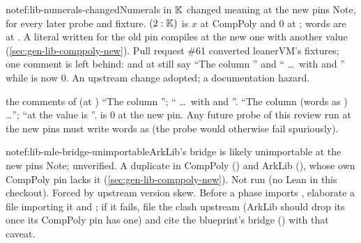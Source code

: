 \begin{finding}{note}{f:lib-numerals-changed}{Numerals in \texorpdfstring{$\mathbb{K}$}{K} changed meaning at the new pins}
\textsf{Note, for every later probe and fixture.}
 $(2 : \mathbb{K})$ is $x$ at CompPoly  and $0$ at ; words are
 at . A literal written for the old pin compiles at the new one with
another value (\cref{sec:gen-lib-comppoly-new}). Pull request \#61 converted leanerVM's fixtures;
one comment is left behind: \allowbreak{}\allowbreak{}\allowbreak{} and 
at  still say \enquote{The column \lean{[1, 2, 3, 4]}} and \enquote{
\dots\ with  and } while  is now $0$.
 An upstream change adopted; a documentation hazard.
\begin{change}{the comments of \allowbreak{}\allowbreak{}\allowbreak{} (at )}
\asis \enquote{The column \lean{[1, 2, 3, 4]}}; \enquote{ \dots\ with
 and }.
\asproposed \enquote{The column \lean{[1, x, x + 1, x²]} (words  as
) \dots}; \enquote{at  the value is }.
\reason {} is $0$ at the new pin. Any future probe of this review run at the new pins
must write words as  (the probe  would otherwise fail
spuriously).
\end{change}
\end{finding}

\begin{finding}{note}{f:lib-mle-bridge-unimportable}{ArkLib's bridge \texorpdfstring{}{eval\_eq\_MvPolynomial\_MLE} is likely unimportable at the new pins}
\textsf{Note; unverified.}
 A duplicate \allowbreak{}\allowbreak{}\allowbreak{} in CompPoly 
(\allowbreak{}) and ArkLib 
(\allowbreak{}\allowbreak{}), whose own CompPoly pin  lacks it
(\cref{sec:gen-lib-comppoly-new}). Not run (no Lean in this checkout).
 Forced by upstream version skew.
 Before a phase imports \allowbreak{}\allowbreak{}\allowbreak{},
elaborate a file importing it and ; if it fails, file the clash
upstream (ArkLib should drop its  once its CompPoly pin has one) and cite the
blueprint's bridge () with that caveat.
\end{finding}

